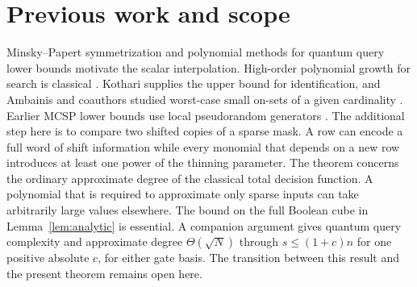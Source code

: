 \documentclass[11pt]{article}
\begin{document}
\section{Previous work and scope}
Minsky--Papert symmetrization and polynomial methods for quantum query lower bounds motivate the scalar interpolation. High-order polynomial growth for search is classical \cite{ksw}. Kothari supplies the upper bound for identification, and Ambainis and coauthors studied worst-case small on-sets of a given cardinality \cite{small}. Earlier MCSP lower bounds use local pseudorandom generators \cite{cklm}. The additional step here is to compare two shifted copies of a sparse mask. A row can encode a full word of shift information while every monomial that depends on a new row introduces at least one power of the thinning parameter. The theorem concerns the ordinary approximate degree of the classical total decision function. A polynomial that is required to approximate only sparse inputs can take arbitrarily large values elsewhere. The bound on the full Boolean cube in Lemma~\ref{lem:analytic} is essential. A companion argument gives quantum query complexity and approximate degree $\Theta(\sqrt N)$ through $s\le(1+c)n$ for one positive absolute $c$, for either gate basis. The transition between this result and the present theorem remains open here.
\end{document}
